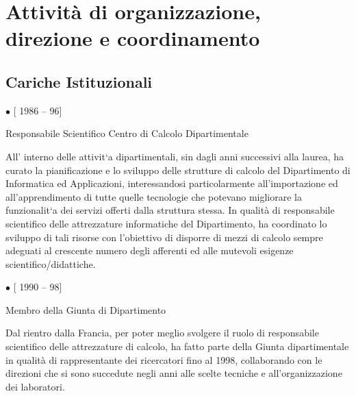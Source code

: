 \documentclass[11pt]{article}
\newlength{\posii}
\newlength{\posiibox}
\newlength{\boxsize}
\begin{document}
\section{Attivit\`a di organizzazione, direzione e coordinamento}

\subsection{Cariche  Istituzionali}
\begin{description}
\item \parbox[t]{\posiibox} 
{\bf \raggedright $ \bullet $ [ 1986 -- 96] \par
\medskip
Responsabile Scientifico Centro di Calcolo Dipartimentale}
\hfill \parbox[t]{\boxsize} {

All' interno delle attivit\a`a dipartimentali, sin dagli anni
successivi alla laurea, ha curato la pianificazione e lo sviluppo
delle strutture di calcolo del Dipartimento di Informatica ed
Applicazioni, interessandosi particolarmente all'importazione ed
all'apprendimento di tutte quelle tecnologie che potevano migliorare
la funzionalit\a`a dei servizi offerti dalla struttura stessa.  In
qualit\`a di responsabile scientifico delle attrezzature informatiche
del Dipartimento, ha coordinato lo sviluppo di tali risorse con
l'obiettivo di disporre di mezzi di calcolo sempre adeguati al
crescente numero degli afferenti ed alle mutevoli esigenze
scientifico/didattiche.  }

\item \parbox[t]{\posiibox}
{\bf  \raggedright $ \bullet $  [ 1990 -- 98] \par
\medskip
Membro della Giunta di Dipartimento}
\hfill \parbox[t]{\boxsize} {

Dal rientro dalla Francia, per poter meglio svolgere il ruolo di
responsabile scientifico delle attrezzature di calcolo, ha fatto parte
della Giunta dipartimentale in qualit\`a di rappresentante dei
ricercatori fino al 1998, collaborando con le direzioni che si sono
succedute negli anni alle scelte tecniche e all'organizzazione dei
laboratori.}


\end{description}
\end{document}
